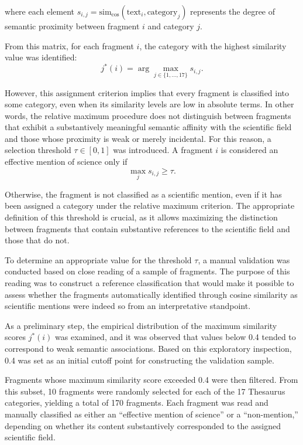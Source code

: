 \documentclass[pdflatex,sn-mathphys-num, iicol]{sn-jnl}
\begin{document}
	where each element $s_{i,j} = \text{sim}_{\cos}(\text{text}_i, \text{category}_j)$ represents the degree of semantic proximity between fragment $i$ and category $j$.
	
	From this matrix, for each fragment $i$, the category with the highest similarity value was identified:
	\[
	j^*(i) = \arg\max_{j \in \{1,\dots,17\}} s_{i,j}.
	\]
	
	However, this assignment criterion implies that every fragment is classified into some category, even when its similarity levels are low in absolute terms. In other words, the relative maximum procedure does not distinguish between fragments that exhibit a substantively meaningful semantic affinity with the scientific field and those whose proximity is weak or merely incidental. For this reason, a selection threshold $\tau \in [0,1]$ was introduced. A fragment $i$ is considered an effective mention of science only if
	\[
	\max_{j} s_{i,j} \geq \tau.
	\]
	
	Otherwise, the fragment is not classified as a scientific mention, even if it has been assigned a category under the relative maximum criterion. The appropriate definition of this threshold is crucial, as it allows maximizing the distinction between fragments that contain substantive references to the scientific field and those that do not.
	
	To determine an appropriate value for the threshold $\tau$, a manual validation was conducted based on close reading of a sample of fragments. The purpose of this reading was to construct a reference classification that would make it possible to assess whether the fragments automatically identified through cosine similarity as scientific mentions were indeed so from an interpretative standpoint.
	
	As a preliminary step, the empirical distribution of the maximum similarity scores $j^*(i)$ was examined, and it was observed that values below 0.4 tended to correspond to weak semantic associations. Based on this exploratory inspection, 0.4 was set as an initial cutoff point for constructing the validation sample.
	
	Fragments whose maximum similarity score exceeded 0.4 were then filtered. From this subset, 10 fragments were randomly selected for each of the 17 Thesaurus categories, yielding a total of 170 fragments. Each fragment was read and manually classified as either an “effective mention of science” or a “non-mention,” depending on whether its content substantively corresponded to the assigned scientific field.
	
\end{document}
